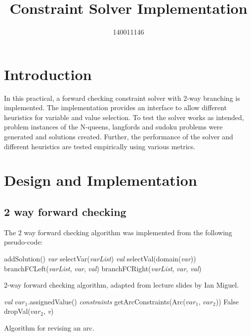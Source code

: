 \documentclass{article}
\title{Constraint Solver Implementation}
\author{140011146}
\begin{document}




\section{Introduction}
In this practical, a forward checking constraint solver with 2-way branching is implemented. The implementation provides an interface to allow different heuristics for variable and value selection. To test the solver works as intended, problem instances of the N-queens, langfords and sudoku problems were generated and solutions created. Further, the performance of the solver and different heuristics are tested empirically using various metrics.

\section{Design and Implementation}

\subsection{2 way forward checking}
The 2 way forward checking algorithm was implemented from the following pseudo-code:
\begin{algorithm}
\begin{algorithmic}[1]
	\State addSolution()
	\Return
\Else
	\State \textit{var} \gets selectVar(\textit{varList})
	\State \textit{val} \gets selectVal(domain(\textit{var}))
	\State branchFCLeft(\textit{varList}, \textit{var}, \textit{val})
	\State branchFCRight(\textit{varList}, \textit{var}, \textit{val})
\EndIf
\EndProcedure
\end{algorithmic}
\caption{2-way forward checking algorithm, adapted from lecture slides by Ian Miguel.}
\end{algorithm}


\begin{algorithm}
\begin{algorithmic}[2]
\State \textit{val} \gets $var_1$.assignedValue()
\State \textit{constraints} \gets getArcConstraints(Arc($var_1$, $var_2$))
	\Return False
\Else
				dropVal($var_2$, \textit{v})
			\EndIf
		\EndFor
	\EndFor
\EndIf
\EndProcedure
\end{algorithmic}
\caption{Algorithm for revising an arc.}
\end{algorithm}
\end{document}

